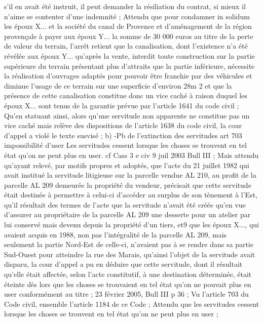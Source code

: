 \documentclass[11pt,a4paper]{report}
\begin{document}
	s'il en avait été instruit, il peut demander la résiliation du contrat, si mieux il n'aime se contenter d'une
	indemnité ;
	Attendu que pour condamner in solidum les époux X... et la société du canal de Provence et d'aménagement de
	la région provençale à payer aux époux Y... la somme de 30 000 euros au titre de la perte de valeur du terrain,
	l'arrêt retient que la canalisation, dont l'existence n'a été révélée aux époux Y... qu'après la vente, interdit toute
	construction sur la partie supérieure du terrain présentant plus d'attraits que la partie inférieure, nécessite la
	réalisation d'ouvrages adaptés pour pouvoir être franchie par des véhicules et diminue l'usage de ce terrain sur
	une superficie d'environ 28m 2 et que la présence de cette canalisation constitue donc un vice caché à raison
	duquel les époux X... sont tenus de la garantie prévue par l'article 1641 du code civil ;
	Qu'en statuant ainsi, alors qu'une servitude non apparente ne constitue pas un vice caché mais relève des
	dispositions de l'article 1638 du code civil, la cour d'appel a violé le texte susvisé ;
	b) -Pb de l’extinction des servitudes
	art 703 impossibilité d’user
	Les servitudes cessent lorsque les choses se trouvent en tel état qu'on ne peut plus en user.
	cf Cass 3 e civ 9 juil 2003 Bull III ;
	Mais attendu qu'ayant relevé, par motifs propres et adoptés, que l'acte du 21 juillet 1982 qui avait institué la
	servitude litigieuse sur la parcelle vendue AL 210, au profit de la parcelle AL 209 demeurée la propriété du
	vendeur, précisait que cette servitude était destinée à permettre à celui-ci d'accéder au surplus de son tènement
	à l'Est, qu'il résultait des termes de l'acte que la servitude n'avait été créée qu'en vue d'assurer au propriétaire
	de la parcelle AL 209 une desserte pour un atelier par lui conservé mais devenu depuis la propriété d'un tiers, et9
	que les époux X..., qui avaient acquis en 1988, non pas l'intégralité de la parcelle AL 209, mais seulement la
	partie Nord-Est de celle-ci, n'avaient pas à se rendre dans sa partie Sud-Ouest pour atteindre la rue des Marais,
	qu'ainsi l'objet de la servitude avait disparu, la cour d'appel a pu en déduire que cette servitude, dont il résultait
	qu'elle était affectée, selon l'acte constitutif, à une destination déterminée, était éteinte dès lors que les choses se
	trouvaient en tel état qu'on ne pouvait plus en user conformément au titre ;
	23 février 2005, Bull III  p 36 ; Vu l'article 703 du Code civil, ensemble l'article 1184 de ce Code ; Attendu
	que les servitudes cessent lorsque les choses se trouvent en tel état qu'on ne peut plus en user ;
\end{document}
